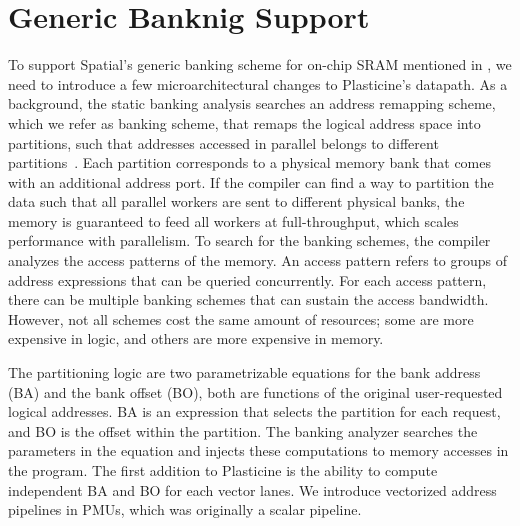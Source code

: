 \section{Generic Banknig Support} \label{sec:banking_arch}

To support Spatial's generic banking scheme for on-chip SRAM mentioned in , 
we need to introduce a few microarchitectural changes to Plasticine's datapath.
As a background, the static banking analysis searches an address remapping scheme, which we refer as
banking scheme, that remaps the logical address space into partitions, such that addresses accessed
in parallel belongs to different partitions~\cite{poly_cong}. 
Each partition corresponds to a physical memory bank that comes with an additional address port.
If the compiler can find a way to partition the data such that all parallel workers are sent to
different physical banks, the memory is guaranteed to feed all workers at full-throughput, which
scales performance with parallelism.
To search for the banking schemes, the compiler analyzes the access patterns of the memory.
An access pattern refers to groups of address expressions that can be queried concurrently.
For each access pattern, there can be multiple banking schemes that can sustain the access bandwidth.
However, not all schemes cost the same amount of resources; some are more expensive in logic, and
others are more expensive in memory.

The partitioning logic are two parametrizable equations for the bank address (BA) and the bank offset (BO),
both are functions of the original user-requested logical addresses.
BA is an expression that selects the partition for each request, and BO is the offset within the partition.
The banking analyzer searches the parameters in the equation and injects these computations to
memory accesses in the program. 
The first addition to Plasticine is the ability to compute independent BA and BO for each vector
lanes. 
We introduce vectorized address pipelines in PMUs, which was originally a scalar pipeline.

